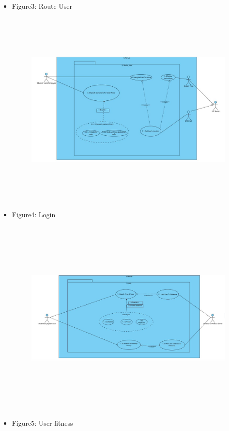 \documentclass[12pt, a4paper]{article}
\begin{document}
\begin{center}
\begin{itemize}
		\item Figure3: Route User
			\begin{figure}[H]\includegraphics[width = \textwidth, height = 10cm]{Route_User.JPG} \end{figure}
		\item Figure4: Login
			\begin{figure}[H]\includegraphics[width = \textwidth, height = 10cm]{Login.JPG} \end{figure}
		\item Figure5: User fitness

\end{itemize}
\end{center}
\end{document}
